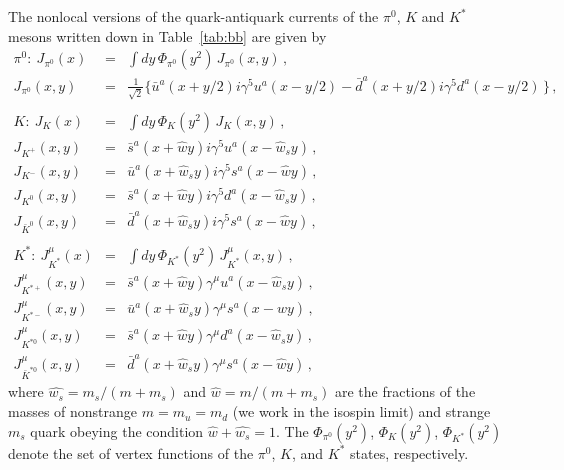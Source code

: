 \documentclass[aps,prd,floatfix,superscriptaddress,showpacs,showkeys]{revtex4}
\newcommand{\bea}{\begin{eqnarray}}
\newcommand{\ena}{\end{eqnarray}}
\begin{document}
The nonlocal versions of the quark-antiquark currents of 
the $\pi^0$, $K$ and $K^*$ mesons written down in Table~\ref{tab:bb} 
are given by 
% 
\bea 
\pi^0: \ J_{\pi^0}(x) &=& \int\! dy \, 
\Phi_{\pi^0}(y^2) \, J_{\pi^0}(x,y)\,, 
\label{eq:nonlocal-pi0}\\
J_{\pi^0}(x,y)&=&  \frac{1}{\sqrt{2}} 
\Big\{
  \bar u^a(x+y/2) i\gamma^5 u^a(x-y/2) 
- \bar d^a(x+y/2) i\gamma^5 d^a(x-y/2)  
\,\Big\}\,,\nonumber\\
& &\nonumber\\
K: \ J_{K}(x) &=& \int\! dy \, 
\Phi_{K}(y^2) \, J_{K}(x,y)\,, 
\label{eq:nonlocal-K}\\
J_{K^+}(x,y)     
&=& \bar s^a(x+\hat{w} y) i\gamma^5 u^a(x-\hat{w}_s y) \,, \nonumber\\
J_{K^-}(x,y)     
&=& \bar u^a(x+\hat{w}_s y)   i\gamma^5 s^a(x-\hat{w} y) \,, \nonumber\\
J_{K^0}(x,y)     
&=& \bar s^a(x+\hat{w} y) i\gamma^5 d^a(x-\hat{w}_s y) \,, \nonumber\\
J_{\bar K^0}(x,y) 
&=& \bar d^a(x+\hat{w}_s y)   i\gamma^5 s^a(x-\hat{w} y) \,, \nonumber\\
& &\nonumber\\
K^*: \ J_{K^*}^\mu(x) &=& \int\! dy \, 
\Phi_{K^*}(y^2) \, J_{K^*}^\mu(x,y)\,, 
\label{eq:nonlocal-Kstar}\\
J_{K^{*+}}^\mu(x,y) 
&=& \bar s^a(x+\hat{w} y) \gamma^\mu u^a(x-\hat{w}_s y)   \,, \nonumber\\
J_{K^{*-}}^\mu(x,y)      
&=& \bar u^a(x+\hat{w}_s y)   \gamma^\mu s^a(x-\hat{w} y) \,, \nonumber\\
J_{K^{*0}}^\mu(x,y)      
&=& \bar s^a(x+\hat{w} y) \gamma^\mu d^a(x-\hat{w}_s y) \,, \nonumber\\
J_{\bar K^{*0}}^\mu(x,y) 
&=& \bar d^a(x+\hat{w}_s y) \gamma^\mu s^a(x-\hat{w} y) \,, \nonumber
\ena 
where $\hat{w_s} = m_s/(m+m_s)$ and $\hat{w} = m/(m+m_s)$ are the fractions 
of the masses of nonstrange $m=m_u=m_d$ (we work in the isospin limit) 
and strange $m_s$ quark obeying the condition $\hat{w} + \hat{w_s} = 1$. 
The $\Phi_{\pi^0}(y^2)$, $\Phi_{K}(y^2)$, $\Phi_{K^*}(y^2)$ 
denote the set of vertex functions of the $\pi^0$, $K$, and $K^*$ states,
respectively.
\end{document}

